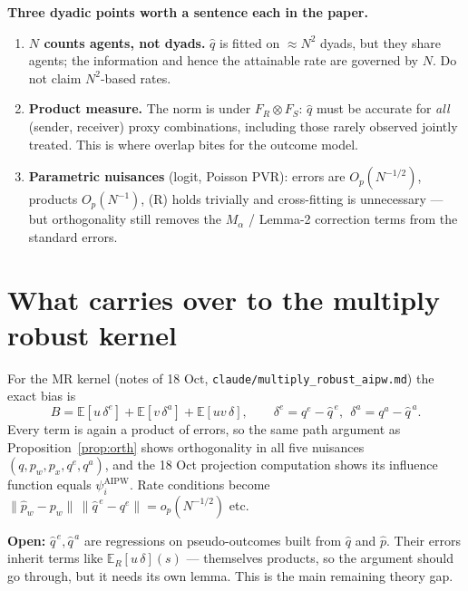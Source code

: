 \documentclass[11pt,a4paper]{article}
\theoremstyle{remark}
\newcommand{\E}{\mathbb{E}}
\newcommand{\1}{\mathbf{1}}
\newcommand{\qe}{q^{e}}
\newcommand{\qa}{q^{a}}
\begin{document}
\noindent\textbf{Three dyadic points worth a sentence each in the paper.}
\begin{enumerate}[leftmargin=*]
\item \textbf{$N$ counts agents, not dyads.} $\hat q$ is fitted on $\approx N^2$ dyads, but they share agents; the information and hence the attainable rate are governed by $N$. Do not claim $N^2$-based rates.
\item \textbf{Product measure.} The norm is under $F_R\otimes F_S$: $\hat q$ must be accurate for \emph{all} (sender, receiver) proxy combinations, including those rarely observed jointly treated. This is where overlap bites for the outcome model.
\item \textbf{Parametric nuisances} (logit, Poisson PVR): errors are $O_p(N^{-1/2})$, products $O_p(N^{-1})$, (R) holds trivially and cross-fitting is unnecessary --- but orthogonality still removes the $M_\alpha$ / Lemma-2 correction terms from the standard errors.
\end{enumerate}

\section{What carries over to the multiply robust kernel}

For the MR kernel (notes of 18 Oct, \texttt{claude/multiply\_robust\_aipw.md}) the exact bias is
\[
B=\E[u\,\delta^e]+\E[v\,\delta^a]+\E[uv\,\delta],\qquad \delta^e=\qe-\hat q^{\,e},\ \ \delta^a=\qa-\hat q^{\,a}.
\]
Every term is again a product of errors, so the same path argument as Proposition~\ref{prop:orth} shows orthogonality in all five nuisances $(q,p_w,p_x,\qe,\qa)$, and the 18 Oct projection computation shows its influence function equals $\psi^{\mathrm{AIPW}}_i$. Rate conditions become $\|\hat p_w-p_w\|\,\|\hat q^{\,e}-\qe\|=o_p(N^{-1/2})$ etc.

\noindent\textbf{Open:} $\hat q^{\,e},\hat q^{\,a}$ are regressions on pseudo-outcomes built from $\hat q$ and $\hat p$. Their errors inherit terms like $\E_R[u\,\delta](s)$ --- themselves products, so the argument should go through, but it needs its own lemma. This is the main remaining theory gap.

\end{document}
